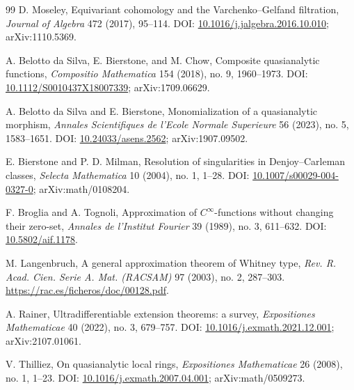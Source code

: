 \documentclass[11pt]{article}
\theoremstyle{definition}
\theoremstyle{remark}
\begin{document}
\begin{thebibliography}{99}
D. Moseley,
\newblock Equivariant cohomology and the Varchenko--Gelfand filtration,
\newblock \emph{Journal of Algebra} 472 (2017), 95--114.
\newblock DOI: \href{https://doi.org/10.1016/j.jalgebra.2016.10.010}{10.1016/j.jalgebra.2016.10.010}; arXiv:1110.5369.

A. Belotto da Silva, E. Bierstone, and M. Chow,
\newblock Composite quasianalytic functions,
\newblock \emph{Compositio Mathematica} 154 (2018), no. 9, 1960--1973.
\newblock DOI: \href{https://doi.org/10.1112/S0010437X18007339}{10.1112/S0010437X18007339}; arXiv:1709.06629.

A. Belotto da Silva and E. Bierstone,
\newblock Monomialization of a quasianalytic morphism,
\newblock \emph{Annales Scientifiques de l'Ecole Normale Superieure} 56 (2023), no. 5, 1583--1651.
\newblock DOI: \href{https://doi.org/10.24033/asens.2562}{10.24033/asens.2562}; arXiv:1907.09502.

E. Bierstone and P. D. Milman,
\newblock Resolution of singularities in Denjoy--Carleman classes,
\newblock \emph{Selecta Mathematica} 10 (2004), no. 1, 1--28.
\newblock DOI: \href{https://doi.org/10.1007/s00029-004-0327-0}{10.1007/s00029-004-0327-0}; arXiv:math/0108204.


F. Broglia and A. Tognoli,
\newblock Approximation of $C^\infty$-functions without changing their zero-set,
\newblock \emph{Annales de l'Institut Fourier} 39 (1989), no. 3, 611--632.
\newblock DOI: \href{https://doi.org/10.5802/aif.1178}{10.5802/aif.1178}.

M. Langenbruch,
\newblock A general approximation theorem of Whitney type,
\newblock \emph{Rev. R. Acad. Cien. Serie A. Mat. (RACSAM)} 97 (2003), no. 2, 287--303.
\newblock \url{https://rac.es/ficheros/doc/00128.pdf}.

A. Rainer,
\newblock Ultradifferentiable extension theorems: a survey,
\newblock \emph{Expositiones Mathematicae} 40 (2022), no. 3, 679--757.
\newblock DOI: \href{https://doi.org/10.1016/j.exmath.2021.12.001}{10.1016/j.exmath.2021.12.001}; arXiv:2107.01061.

V. Thilliez,
\newblock On quasianalytic local rings,
\newblock \emph{Expositiones Mathematicae} 26 (2008), no. 1, 1--23.
\newblock DOI: \href{https://doi.org/10.1016/j.exmath.2007.04.001}{10.1016/j.exmath.2007.04.001}; arXiv:math/0509273.

\end{thebibliography}
\end{document}
